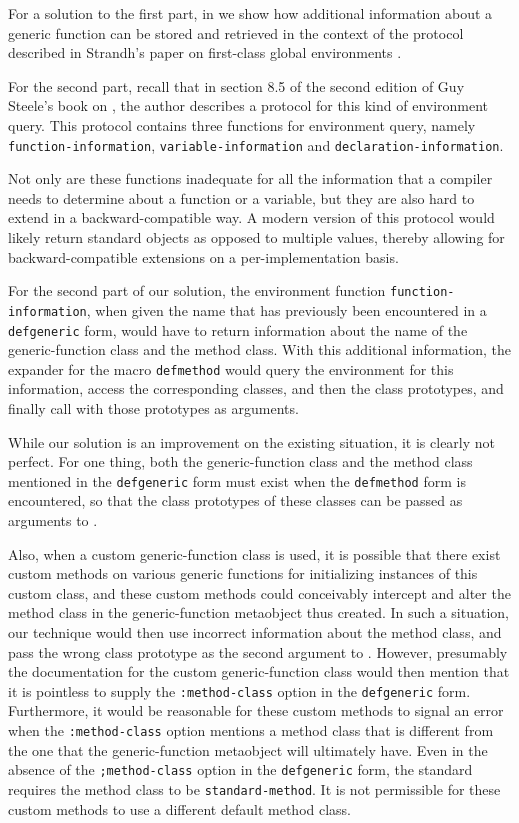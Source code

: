 For a solution to the first part, in  we show how
additional information about a generic function can be stored and
retrieved in the context of the protocol described in Strandh's paper
on first-class global environments
\cite{Strandh:2015:ELS:Environments}.

For the second part, recall that in section 8.5 of the second edition
of Guy Steele's book on \commonlisp{} \cite{Steele:1990:CLL:95411},
the author describes a protocol for this kind of environment query.
This protocol contains three functions for environment query, namely
\texttt{function-information}, \texttt{variable-information} and
  \texttt{declaration-information}.

Not only are these functions inadequate for all the information that a
compiler needs to determine about a function or a variable, but they
are also hard to extend in a backward-compatible way.  A modern
version of this protocol would likely return standard objects as
opposed to multiple values, thereby allowing for backward-compatible
extensions on a per-implementation basis.

For the second part of our solution, the environment function
\texttt{function-information}, when given the name that has previously
been encountered in a \texttt{defgeneric} form, would have to return
information about the name of the generic-function class and the
method class.  With this additional information, the expander for the
macro \texttt{defmethod} would query the environment for this
information, access the corresponding classes, and then the class
prototypes, and finally call \mml{} with those prototypes as
arguments.

While our solution is an improvement on the existing situation, it is
clearly not perfect.  For one thing, both the generic-function class
and the method class mentioned in the \texttt{defgeneric} form must
exist when the \texttt{defmethod} form is encountered, so that the
class prototypes of these classes can be passed as arguments to \mml{}.

Also, when a custom generic-function class is used, it is possible
that there exist custom methods on various generic functions for
initializing instances of this custom class, and these custom methods
could conceivably intercept and alter the method class in the
generic-function metaobject thus created.  In such a situation, our
technique would then use incorrect information about the method class,
and pass the wrong class prototype as the second argument to \mml{}.
However, presumably the documentation for the custom generic-function
class would then mention that it is pointless to supply the
\texttt{:method-class} option in the \texttt{defgeneric} form.
Furthermore, it would be reasonable for these custom methods to signal
an error when the \texttt{:method-class} option mentions a method
class that is different from the one that the generic-function
metaobject will ultimately have.  Even in the absence of the
\texttt{;method-class} option in the \texttt{defgeneric} form, the
\commonlisp{} standard requires the method class to be
\texttt{standard-method}.  It is not permissible for these custom
methods to use a different default method class.
